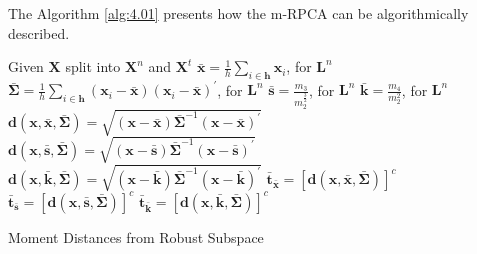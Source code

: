 The Algorithm \ref{alg:4.01} presents how the m-RPCA can be algorithmically described.
\begin{algorithm}
	\label{alg:4.01}
	\SetAlgoLined
	Given $\boldsymbol{X}$ split into $\boldsymbol{X}^n$ and $\boldsymbol{X}^t$\;
	$\bar{\boldsymbol{x}} = \displaystyle\frac{1}{h}\displaystyle\sum_{i\in \boldsymbol{h}} \boldsymbol{x}_i$, for $\boldsymbol{L}^n$\;
	$\boldsymbol{\bar{\Sigma}} = \displaystyle\frac{1}{h}\displaystyle\sum_{i\in \boldsymbol{h}} (\boldsymbol{x}_i - \bar{\boldsymbol{x}})(\boldsymbol{x}_i - \bar{\boldsymbol{x}})^\prime$, for $\boldsymbol{L}^n$\;
	$\boldsymbol{\bar{s}} = \frac{m_3}{m_2^{\frac{3}{2}}}$, for $\boldsymbol{L}^n$\;
	$\boldsymbol{\bar{k}} = \frac{m_4}{m_2^2}$, for $\boldsymbol{L}^n$\;
	$\boldsymbol{d}(\boldsymbol{x},\bar{\boldsymbol{x}}, \boldsymbol{\bar{\Sigma}}) = \sqrt{(\boldsymbol{x} - \bar{\boldsymbol{x}}) \boldsymbol{\bar{\Sigma}}^{-1}(\boldsymbol{x} - \bar{\boldsymbol{x}})^\prime}$\;
	$\boldsymbol{d}(\boldsymbol{x}, \bar{\boldsymbol{s}}, \boldsymbol{\bar{\Sigma}}) = \sqrt{(\boldsymbol{x} - \bar{\boldsymbol{s}}) \boldsymbol{\bar{\Sigma}}^{-1}(\boldsymbol{x} - \bar{\boldsymbol{s}})^\prime}$\;
	$\boldsymbol{d}(\boldsymbol{x}, \bar{\boldsymbol{k}}, \boldsymbol{\bar{\Sigma}}) = \sqrt{(\boldsymbol{x} - \bar{\boldsymbol{k}}) \boldsymbol{\bar{\Sigma}}^{-1}(\boldsymbol{x} - \bar{\boldsymbol{k}})^\prime}$\;
	$\boldsymbol{\bar{t}}_{\bar{\boldsymbol{x}}} = [\boldsymbol{d}(\boldsymbol{x}, \bar{\boldsymbol{x}}, \boldsymbol{\bar{\Sigma}})]^c$\;
	$\boldsymbol{\bar{t}}_{\bar{\boldsymbol{s}}} = [\boldsymbol{d}(\boldsymbol{x}, \bar{\boldsymbol{s}}, \boldsymbol{\bar{\Sigma}})]^c$\;
	$\boldsymbol{\bar{t}}_{\bar{\boldsymbol{k}}} = [\boldsymbol{d}(\boldsymbol{x}, \bar{\boldsymbol{k}}, \boldsymbol{\bar{\Sigma}})]^c$\;
	\caption{Moment Distances from Robust Subspace}
\end{algorithm}

